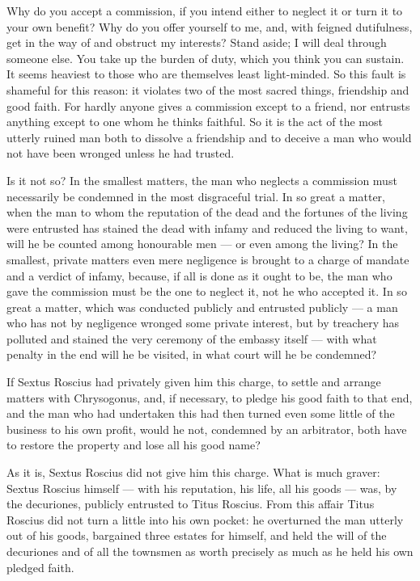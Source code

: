  Why do you accept a commission, if you intend either to neglect it or turn it to your own benefit? Why do you offer yourself to me, and, with feigned dutifulness, get in the way of and obstruct my interests? Stand aside; I will deal through someone else. You take up the burden of duty, which you think you can sustain. It seems heaviest to those who are themselves least light-minded. So this fault is shameful for this reason: it violates two of the most sacred things, friendship and good faith. For hardly anyone gives a commission except to a friend, nor entrusts anything except to one whom he thinks faithful. So it is the act of the most utterly ruined man both to dissolve a friendship and to deceive a man who would not have been wronged unless he had trusted.

 Is it not so? In the smallest matters, the man who neglects a commission must necessarily be condemned in the most disgraceful trial. In so great a matter, when the man to whom the reputation of the dead and the fortunes of the living were entrusted has stained the dead with infamy and reduced the living to want, will he be counted among honourable men --- or even among the living? In the smallest, private matters even mere negligence is brought to a charge of mandate and a verdict of infamy, because, if all is done as it ought to be, the man who gave the commission must be the one to neglect it, not he who accepted it. In so great a matter, which was conducted publicly and entrusted publicly --- a man who has not by negligence wronged some private interest, but by treachery has polluted and stained the very ceremony of the embassy itself --- with what penalty in the end will he be visited, in what court will he be condemned?

 If Sextus Roscius had privately given him this charge, to settle and arrange matters with Chrysogonus, and, if necessary, to pledge his good faith to that end, and the man who had undertaken this had then turned even some little of the business to his own profit, would he not, condemned by an arbitrator, both have to restore the property and lose all his good name?

 As it is, Sextus Roscius did not give him this charge. What is much graver: Sextus Roscius himself --- with his reputation, his life, all his goods --- was, by the decuriones, publicly entrusted to Titus Roscius. From this affair Titus Roscius did not turn a little into his own pocket: he overturned the man utterly out of his goods, bargained three estates for himself, and held the will of the decuriones and of all the townsmen as worth precisely as much as he held his own pledged faith.


